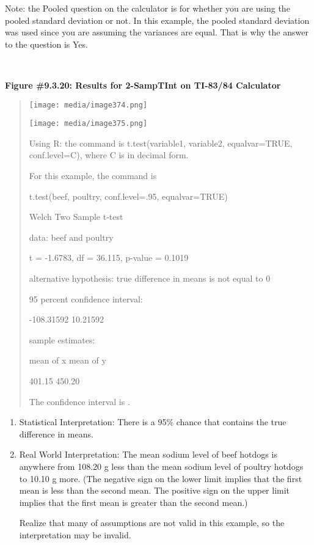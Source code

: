 \documentclass[]{book}
\begin{document}
Note: the Pooled question on the calculator is for whether you are using
the pooled standard deviation or not. In this example, the pooled
standard deviation was used since you are assuming the variances are
equal. That is why the answer to the question is Yes.

\textbf{\\
}

\textbf{Figure \#9.3.20: Results for 2-SampTInt on TI-83/84 Calculator}

\begin{quote}
\texttt{[image: media/image374.png]}

\texttt{[image: media/image375.png]}

Using R: the command is t.test(variable1, variable2, equalvar=TRUE,
conf.level=C), where C is in decimal form.

For this example, the command is

t.test(beef, poultry, conf.level=.95, equalvar=TRUE)

Welch Two Sample t-test

data: beef and poultry

t = -1.6783, df = 36.115, p-value = 0.1019

alternative hypothesis: true difference in means is not equal to 0

95 percent confidence interval:

-108.31592 10.21592

sample estimates:

mean of x mean of y

401.15 450.20

The confidence interval is .
\end{quote}

\begin{enumerate}
\def\labelenumi{\arabic{enumi}.}
\setcounter{enumi}{3}
\item
  Statistical Interpretation: There is a 95\% chance that contains the
  true difference in means.
\item
  Real World Interpretation: The mean sodium level of beef hotdogs is
  anywhere from 108.20 g less than the mean sodium level of poultry
  hotdogs to 10.10 g more. (The negative sign on the lower limit
  implies that the first mean is less than the second mean. The
  positive sign on the upper limit implies that the first mean is
  greater than the second mean.)

  Realize that many of assumptions are not valid in this example, so
  the interpretation may be invalid.
\end{enumerate}
\end{document}
